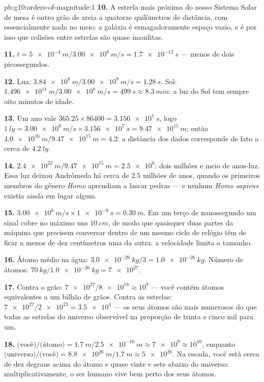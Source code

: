 \begin{solution}{pb:g10:orders-of-magnitude:1}
\textbf{10.} A estrela mais próxima do nosso Sistema Solar de mesa é
outro grão de areia a quatorze quilômetros de distância, com
essencialmente nada no meio: a galáxia é esmagadoramente espaço vazio, e
é por isso que colisões entre estrelas são quase inauditas.

\textbf{11.} $t = \qty{5e-4}{m}/\qty{3.00e8}{m/s} = \qty{1.7e-12}{s}$
--- menos de dois picossegundos.

\textbf{12.} Lua: $\qty{3.84e8}{m}/\qty{3.00e8}{m/s} = \qty{1.28}{s}$.
Sol: $\qty{1.496e11}{m}/\qty{3.00e8}{m/s} = \qty{499}{s} \approx
\qty{8.3}{min}$: a luz do Sol tem sempre oito minutos de idade.

\textbf{13.} Um ano vale $365.25 \times 86400 = \qty{3.156e7}{s}$, logo
$\qty{1}{ly} = \qty{3.00e8}{m/s} \times \qty{3.156e7}{s}
= \qty{9.47e15}{m}$; então
$\qty{4.0e16}{m}/\qty{9.47e15}{m} = 4.2$: a distância dos dados
corresponde de fato a cerca de $\qty{4.2}{ly}$.

\textbf{14.} $\qty{2.4e22}{m}/\qty{9.47e15}{m} = \num{2.5e6}$: dois
milhões e meio de anos-luz. Essa luz deixou Andrômeda há cerca de $2.5$
milhões de anos, quando os primeiros membros do gênero \emph{Homo}
aprendiam a lascar pedras --- e nenhum \emph{Homo sapiens} existia ainda
em lugar algum.

\textbf{15.} $\qty{3.00e8}{m/s} \times \qty{1e-9}{s} = \qty{0.30}{m}$.
Em um terço de nanossegundo um sinal cobre no máximo uns
$\qty{10}{cm}$, de modo que quaisquer duas partes da máquina que
precisem conversar dentro de um mesmo ciclo de relógio têm de ficar a
menos de dez centímetros uma da outra: a velocidade limita o tamanho.

\textbf{16.} Átomo médio na água:
$\qty{3.0e-26}{kg}/3 = \qty{1.0e-26}{kg}$. Número de átomos:
$\qty{70}{kg}/\qty{1.0e-26}{kg} = \num{7e27}$.

\textbf{17.} Contra o grão: $\num{7e27}/\num{8e18} \approx 10^{9}$ ---
você contém átomos equivalentes a um bilhão de grãos. Contra as
estrelas: $\num{7e27}/\num{2e23} = \num{3.5e4}$ --- os seus átomos são
mais numerosos do que todas as estrelas do universo observável na
proporção de trinta e cinco mil para um.

\textbf{18.} $\text{(você)}/\text{(átomo)} =
\qty{1.7}{m}/\qty{2.5e-10}{m} \approx \num{7e9} \approx 10^{10}$,
enquanto $\text{(universo)}/\text{(você)} =
\qty{8.8e26}{m}/\qty{1.7}{m} \approx \num{5e26}$. Na escada, você está
cerca de dez degraus acima do átomo e quase vinte e sete abaixo do
universo: multiplicativamente, o ser humano vive bem perto dos seus
átomos.


\end{solution}
